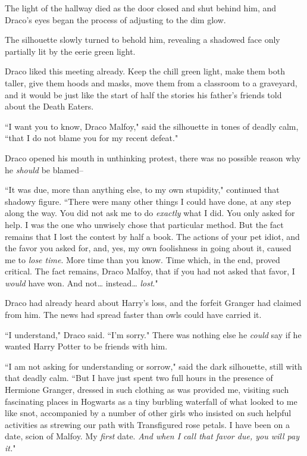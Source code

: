 The light of the hallway died as the door closed and shut behind him, and Draco's eyes began the process of adjusting to the dim glow.

The silhouette slowly turned to behold him, revealing a shadowed face only partially lit by the eerie green light.

Draco liked this meeting already. Keep the chill green light, make them both taller, give them hoods and masks, move them from a classroom to a graveyard, and it would be just like the start of half the stories his father's friends told about the Death Eaters.

``I want you to know, Draco Malfoy," said the silhouette in tones of deadly calm, ``that I do not blame you for my recent defeat."

Draco opened his mouth in unthinking protest, there was no possible reason why he \emph{should} be blamed\---

``It was due, more than anything else, to my own stupidity," continued that shadowy figure. ``There were many other things I could have done, at any step along the way. You did not ask me to do \emph{exactly} what I did. You only asked for help. I was the one who unwisely chose that particular method. But the fact remains that I lost the contest by half a book. The actions of your pet idiot, and the favor you asked for, and, yes, my own foolishness in going about it, caused me to \emph{lose time}. More time than you know. Time which, in the end, proved critical. The fact remains, Draco Malfoy, that if you had not asked that favor, I \emph{would} have won. And not{\ldots} instead{\ldots} \emph{lost}."

Draco had already heard about Harry's loss, and the forfeit Granger had claimed from him. The news had spread faster than owls could have carried it.

``I understand," Draco said. ``I'm sorry." There was nothing else he \emph{could} say if he wanted Harry Potter to be friends with him.

``I am not asking for understanding or sorrow," said the dark silhouette, still with that deadly calm. ``But I have just spent two full hours in the presence of Hermione Granger, dressed in such clothing as was provided me, visiting such fascinating places in Hogwarts as a tiny burbling waterfall of what looked to me like snot, accompanied by a number of other girls who insisted on such helpful activities as strewing our path with Transfigured rose petals. I have been on a date, scion of Malfoy. My \emph{first} date. \emph{And when I call that favor due, you will pay it.}"

